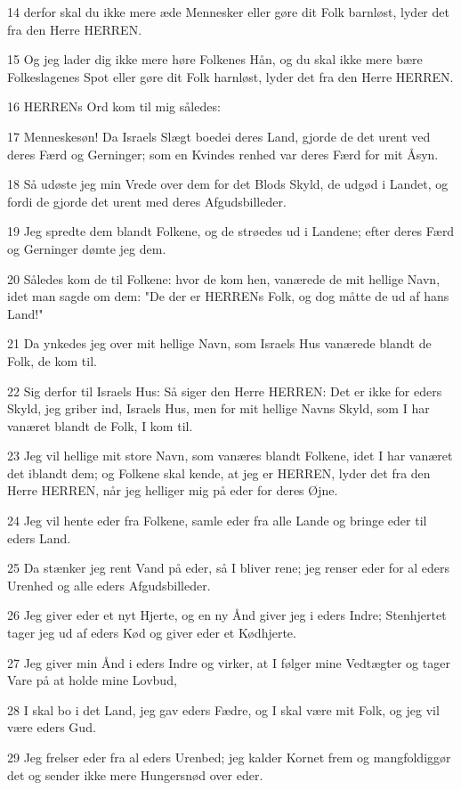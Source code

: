 \par 14 derfor skal du ikke mere æde Mennesker eller gøre dit Folk barnløst, lyder det fra den Herre HERREN.
\par 15 Og jeg lader dig ikke mere høre Folkenes Hån, og du skal ikke mere bære Folkeslagenes Spot eller gøre dit Folk harnløst, lyder det fra den Herre HERREN.
\par 16 HERRENs Ord kom til mig således:
\par 17 Menneskesøn! Da Israels Slægt boedei deres Land, gjorde de det urent ved deres Færd og Gerninger; som en Kvindes renhed var deres Færd for mit Åsyn.
\par 18 Så udøste jeg min Vrede over dem for det Blods Skyld, de udgød i Landet, og fordi de gjorde det urent med deres Afgudsbilleder.
\par 19 Jeg spredte dem blandt Folkene, og de strøedes ud i Landene; efter deres Færd og Gerninger dømte jeg dem.
\par 20 Således kom de til Folkene: hvor de kom hen, vanærede de mit hellige Navn, idet man sagde om dem: "De der er HERRENs Folk, og dog måtte de ud af hans Land!"
\par 21 Da ynkedes jeg over mit hellige Navn, som Israels Hus vanærede blandt de Folk, de kom til.
\par 22 Sig derfor til Israels Hus: Så siger den Herre HERREN: Det er ikke for eders Skyld, jeg griber ind, Israels Hus, men for mit hellige Navns Skyld, som I har vanæret blandt de Folk, I kom til.
\par 23 Jeg vil hellige mit store Navn, som vanæres blandt Folkene, idet I har vanæret det iblandt dem; og Folkene skal kende, at jeg er HERREN, lyder det fra den Herre HERREN, når jeg helliger mig på eder for deres Øjne.
\par 24 Jeg vil hente eder fra Folkene, samle eder fra alle Lande og bringe eder til eders Land.
\par 25 Da stænker jeg rent Vand på eder, så I bliver rene; jeg renser eder for al eders Urenhed og alle eders Afgudsbilleder.
\par 26 Jeg giver eder et nyt Hjerte, og en ny Ånd giver jeg i eders Indre; Stenhjertet tager jeg ud af eders Kød og giver eder et Kødhjerte.
\par 27 Jeg giver min Ånd i eders Indre og virker, at I følger mine Vedtægter og tager Vare på at holde mine Lovbud,
\par 28 I skal bo i det Land, jeg gav eders Fædre, og I skal være mit Folk, og jeg vil være eders Gud.
\par 29 Jeg frelser eder fra al eders Urenbed; jeg kalder Kornet frem og mangfoldiggør det og sender ikke mere Hungersnød over eder.

